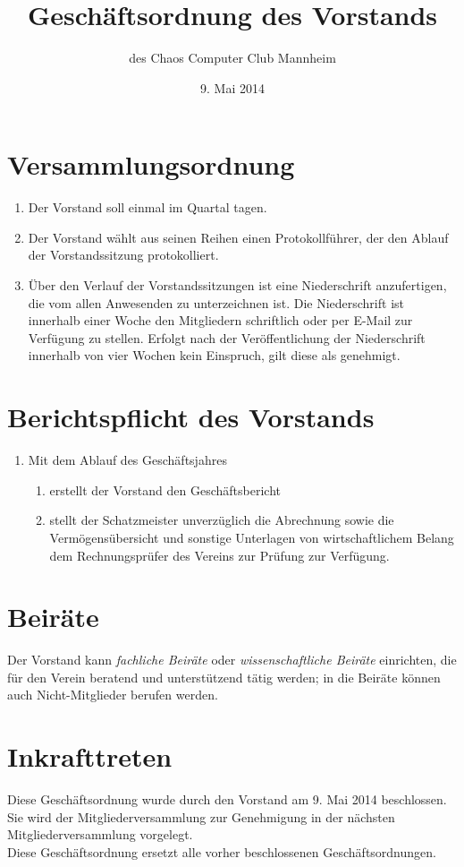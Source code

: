 \documentclass[a4paper, 12pt]{scrartcl}
\title{Geschäftsordnung des Vorstands}
\subtitle{des Chaos Computer Club Mannheim}
\author{}
\date{9. Mai 2014}
\begin{document}
\maketitle

\section{Versammlungsordnung}
\begin{enumerate}
	\item Der Vorstand soll einmal im Quartal tagen.
	\item Der Vorstand wählt aus seinen Reihen einen Protokollführer, der den Ablauf der Vorstandssitzung protokolliert.
	\item Über den Verlauf der Vorstandssitzungen ist eine Niederschrift anzufertigen, die vom allen Anwesenden zu unterzeichnen ist. Die Niederschrift ist innerhalb einer Woche den Mitgliedern schriftlich oder per E-Mail zur Verfügung zu stellen. Erfolgt nach der Veröffentlichung der Niederschrift innerhalb von vier Wochen kein Einspruch, gilt diese als genehmigt.
\end{enumerate}

\section{Berichtspflicht des Vorstands}
\begin{enumerate}
	\item Mit dem Ablauf des Geschäftsjahres
		\begin{enumerate}
			\item erstellt der Vorstand den Geschäftsbericht
			\item  stellt der Schatzmeister unverzüglich die Abrechnung sowie die Vermögensübersicht und sonstige Unterlagen von wirtschaftlichem Belang dem Rechnungsprüfer des Vereins zur Prüfung zur Verfügung.
		\end{enumerate}
\end{enumerate}

\section{Beiräte}
Der Vorstand kann \emph{fachliche Beiräte} oder \emph{wissenschaftliche Beiräte} einrichten,
die für den Verein beratend und unterstützend tätig werden; in die Beiräte können
auch Nicht-Mitglieder berufen werden.

\section{Inkrafttreten}
Diese Geschäftsordnung wurde durch den Vorstand am 9. Mai 2014 beschlossen.\\
Sie wird der Mitgliederversammlung zur Genehmigung in der nächsten Mitgliederversammlung vorgelegt.\\
Diese Geschäftsordnung ersetzt alle vorher beschlossenen Geschäftsordnungen.
\end{document}

